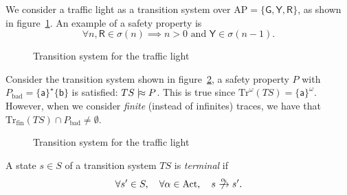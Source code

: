 \documentclass[./main]{subfiles}
\begin{document}
  \begin{exm}
    We consider a traffic light as a transition system over $\mathrm{AP} = \{\mathsf{G}, \mathsf{Y}, \mathsf{R}\}$, as shown in figure~\ref{fig:traffic-light}.
    An example of a safety property is
    \[
    \forall n, \mathsf{R} \in \sigma(n) \implies n > 0 \text{ and } \mathsf{Y} \in \sigma(n-1)
    .\] 
  \end{exm}

  \begin{figure}[b]
    \centering
    \caption{Transition system for the traffic light}
    \label{fig:traffic-light}
  \end{figure}

  \begin{exm}
    Consider the transition system shown in figure~\ref{fig:two-states-ts}, a safety property $P$ with $P_\mathrm{bad} = \{\mathsf{a}\}^\star \{\mathsf{b}\}$ is satisfied: $TS \mathrel{{|}\!{\approx}} P$. 
    This is true since $\mathrm{Tr}^\omega(TS) = \{\mathsf{a}\}^\omega$.
    However, when we consider \textit{finite} (instead of infinites) traces, we have that $\mathrm{Tr}_\mathrm{fin}(TS) \cap P_\mathrm{bad} \neq \emptyset$.
  \end{exm}

  \begin{figure}
    \centering
    \caption{Transition system for the traffic light}
    \label{fig:two-states-ts}
  \end{figure}

  \begin{defn}
    A state $s \in S$ of a transition system $TS$  is \textit{terminal} if
    \[
      \forall s' \in S, \quad \forall \alpha \in \mathrm{Act}, \quad s \centernot{\tr\alpha} s'
    .\]
  \end{defn}
\end{document}
